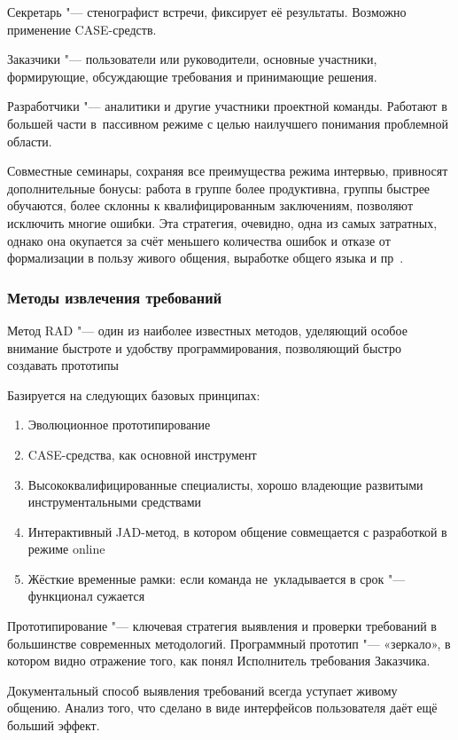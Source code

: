 \documentclass{../industrial-development}
\begin{document}
\alert{Секретарь} "--- стенографист встречи, фиксирует её результаты. Возможно применение CASE-средств.

\alert{Заказчики} "--- пользователи или руководители, основные участники, формирующие, обсуждающие требования и принимающие решения.

\alert{Разработчики} "--- аналитики и другие участники проектной команды. Работают в большей части в~пассивном режиме с целью наилучшего понимания проблемной области.

Совместные семинары, сохраняя все преимущества режима интервью, привносят дополнительные бонусы: работа в группе более продуктивна, группы быстрее обучаются, более склонны к квалифицированным заключениям, позволяют исключить многие ошибки. Эта стратегия, очевидно, одна из самых затратных, однако она окупается за счёт меньшего количества ошибок и отказе от формализации в пользу живого общения,
выработке общего языка и пр~\cite[с.~33]{Maglinec}.


\begin{frame} \frametitle{Методы извлечения требований}
   

\alert {Метод RAD} "--- один из наиболее известных методов, уделяющий особое внимание быстроте и удобству программирования, позволяющий быстро создавать прототипы

Базируется на следующих базовых принципах:
\begin{enumerate}
\item Эволюционное прототипирование
\item CASE-средства, как основной инструмент
\item Высококвалифицированные специалисты, хорошо владеющие развитыми инструментальными средствами
\item Интерактивный JAD-метод, в котором общение совмещается с разработкой в режиме online
\item Жёсткие временные рамки: если команда не~укладывается в срок "--- функционал сужается
\end{enumerate}


\end{frame}
\lecturenotes

Прототипирование "--- ключевая стратегия выявления и проверки требований в большинстве современных методологий. Программный прототип "--- «зеркало», в котором видно отражение того, как понял Исполнитель требования Заказчика. 

Документальный способ выявления требований всегда уступает живому общению. Анализ того, что сделано в виде интерфейсов пользователя даёт ещё больший эффект. 
\end{document}
